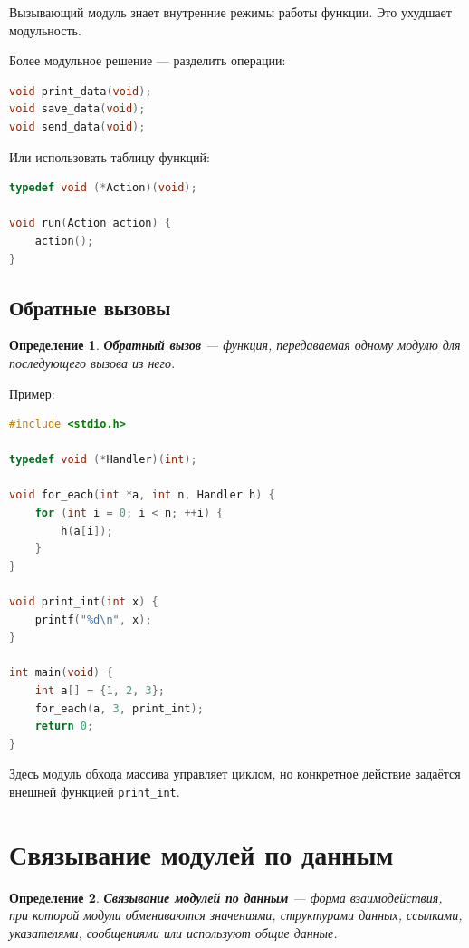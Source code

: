 \documentclass[12pt,a4paper]{article}
\newtheorem{definition}{Определение}
\begin{document}
Вызывающий модуль знает внутренние режимы работы функции. Это ухудшает модульность.

Более модульное решение --- разделить операции:

\begin{lstlisting}[language=C]
void print_data(void);
void save_data(void);
void send_data(void);
\end{lstlisting}

Или использовать таблицу функций:

\begin{lstlisting}[language=C]
typedef void (*Action)(void);

void run(Action action) {
    action();
}
\end{lstlisting}

\subsection{Обратные вызовы}

\begin{definition}
\textbf{Обратный вызов} --- функция, передаваемая одному модулю для последующего вызова из него.
\end{definition}

Пример:

\begin{lstlisting}[language=C]
#include <stdio.h>

typedef void (*Handler)(int);

void for_each(int *a, int n, Handler h) {
    for (int i = 0; i < n; ++i) {
        h(a[i]);
    }
}

void print_int(int x) {
    printf("%d\n", x);
}

int main(void) {
    int a[] = {1, 2, 3};
    for_each(a, 3, print_int);
    return 0;
}
\end{lstlisting}

Здесь модуль обхода массива управляет циклом, но конкретное действие задаётся внешней функцией \texttt{print\_int}.

\section{Связывание модулей по данным}

\begin{definition}
\textbf{Связывание модулей по данным} --- форма взаимодействия, при которой модули обмениваются значениями, структурами данных, ссылками, указателями, сообщениями или используют общие данные.
\end{definition}
\end{document}
